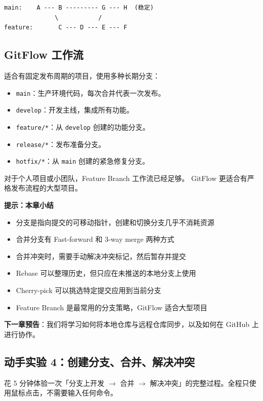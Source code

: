 \documentclass[12pt,a4paper,openany]{ctexbook}
\begin{document}
\begin{verbatim}
main:    A --- B --------- G --- H  (稳定)
              \           /
feature:       C --- D --- E --- F
\end{verbatim}

\subsection{GitFlow 工作流}

适合有固定发布周期的项目，使用多种长期分支：

\begin{itemize}[leftmargin=2em]
  \item \texttt{main}：生产环境代码，每次合并代表一次发布。
  \item \texttt{develop}：开发主线，集成所有功能。
  \item \texttt{feature/*}：从 \texttt{develop} 创建的功能分支。
  \item \texttt{release/*}：发布准备分支。
  \item \texttt{hotfix/*}：从 \texttt{main} 创建的紧急修复分支。
\end{itemize}

对于个人项目或小团队，Feature Branch 工作流已经足够。
GitFlow 更适合有严格发布流程的大型项目。

\noindent\textbf{提示：}\textbf{本章小结}
\begin{itemize}
  \item 分支是指向提交的可移动指针，创建和切换分支几乎不消耗资源
  \item 合并分支有 Fast-forward 和 3-way merge 两种方式
  \item 合并冲突时，需要手动解决冲突标记，然后暂存并提交
  \item Rebase 可以整理历史，但只应在未推送的本地分支上使用
  \item Cherry-pick 可以挑选特定提交应用到当前分支
  \item Feature Branch 是最常用的分支策略，GitFlow 适合大型项目
\end{itemize}
\medskip

\textbf{下一章预告}：我们将学习如何将本地仓库与远程仓库同步，以及如何在 GitHub 上进行协作。

\subsection*{动手实验 4：创建分支、合并、解决冲突}

花 5 分钟体验一次「分支上开发 $\to$ 合并 $\to$ 解决冲突」的完整过程。全程只使用鼠标点击，不需要输入任何命令。
\end{document}
